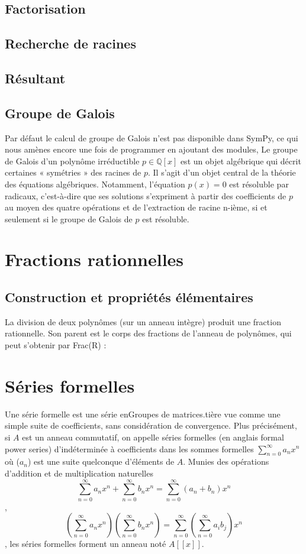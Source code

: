  \subsection{Factorisation}
 \subsection{ Recherche de racines}
 \subsection{ Résultant}
 \subsection{ Groupe de Galois}
 Par défaut le calcul de groupe de Galois n'est pas disponible dans SymPy, ce qui nous amènes encore
 une fois de programmer en ajoutant des modules, Le groupe de Galois d’un polynôme irréductible $p \in \mathbb{Q}\left[x\right]$ est un objet algébrique qui décrit certaines « symétries » des racines de $p$. Il s’agit d’un objet central de la théorie des équations algébriques. Notamment, l’équation $p\left(x\right) = 0$
est résoluble par radicaux, c’est-à-dire que ses solutions s’expriment à partir des coefficients de $p$ au moyen des quatre opérations et de l'extraction de racine n-ième, si et seulement si le groupe de Galois de $p$ est résoluble.
\section{ Fractions rationnelles}
 \subsection{ Construction et propriétés élémentaires}
 La division de deux polynômes (sur un anneau intègre) produit une fraction rationnelle. Son parent est le corps des fractions de l’anneau de polynômes, qui peut s’obtenir par Frac(R) :
 \section{Séries formelles}
 Une série formelle est une série enGroupes de matrices.tière vue comme une simple suite de coefficients, sans considération de convergence. Plus précisément, si $A$ est un anneau commutatif, on appelle séries formelles (en anglais formal
 power series) d’indéterminée  à coefficients dans  les sommes formelles $\sum_{n=0}^{\infty} a_{n}x^{n}$ où ($a_{n}$) est une suite quelconque d’éléments de $A$. Munies des opérations d’addition et de multiplication naturelles
\[
 \sum_{n=0}^{\infty} a_{n}x^{n} + \sum_{n=0}^{\infty} b_{n}x^{n} = \sum_{n=0}^{\infty} \left(a_{n}+b_{n}\right) x^{n} 
 \],
\[
 \left(\sum_{n=0}^{\infty} a_{n}x^{n}\right) \left(\sum_{n=0}^{\infty} b_{n}x^{n}\right) =  \sum_{n=0}^{\infty} \left( \sum_{n=0}^{\infty} a_{i}b_{j}\right)x^{n}
\], les séries formelles forment un anneau noté $A\left[ \left[ x\right] \right] $.\\

